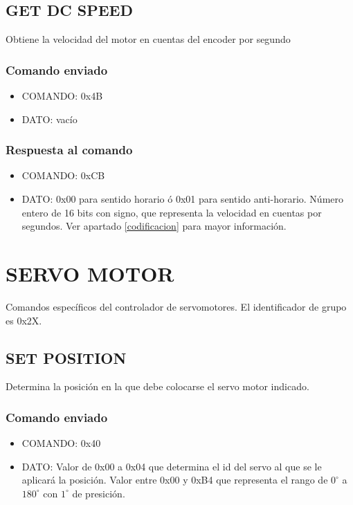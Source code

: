 \documentclass[a4paper,10pt]{article}
\begin{document}
\subsection{GET DC SPEED}
\label{set_dc_speed}

Obtiene la velocidad del motor en cuentas del encoder por segundo

\subsubsection*{Comando enviado}
\begin{itemize}
	\item{COMANDO:} 0x4B
	\item{DATO:} vac\'io
\end{itemize}

\subsubsection*{Respuesta al comando}

\begin{itemize}
	\item{COMANDO:} 0xCB
	\item{DATO:} 0x00 para sentido horario \'o 0x01 para sentido anti-horario.
		N\'umero entero de 16 bits con signo, que representa la velocidad en cuentas por segundos.
		Ver apartado \ref{codificacion} para mayor informaci\'on.
\end{itemize}

\section{SERVO MOTOR}
\label{grupo_servo_motor}

Comandos espec\'ificos del controlador de servomotores.
El identificador de grupo es 0x2X.

\subsection{SET POSITION}
\label{set_position}

Determina la posici\'on en la que debe colocarse el servo motor indicado.

\subsubsection*{Comando enviado}

\begin{itemize}
	\item{COMANDO:} 0x40
	\item{DATO:} Valor de 0x00 a 0x04 que determina el id del servo al que se le aplicar\'a la posici\'on.
	Valor entre 0x00 y 0xB4 que representa el rango de $0^{\circ}$ a $180^{\circ}$ con $1^{\circ}$ de presici\'on.
\end{itemize}
\end{document}
